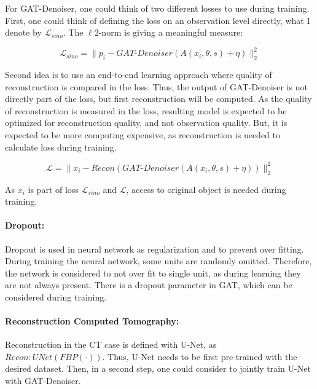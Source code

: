 For GAT-Denoiser, one could think of two different losses to use during training.
First, one could think of defining the loss on an observation level directly, 
what I denote by $\mathcal{L}_{sino}$. The $\ell2$-norm is giving a meaningful measure:

\begin{equation}
  \label{eq:loss_sino}
  \mathcal{L}_{sino} = \parallel p_i - \textit{GAT-Denoiser}(A(x_i, \theta, s) + \eta) \parallel ^2_2
\end{equation}

Second idea is to use an end-to-end learning approach where quality of reconstruction is 
compared in the loss. Thus, the output of GAT-Denoiser is not directly part of the loss, but first reconstruction will be computed.
As the quality of reconstruction is measured in the loss, resulting model is expected to be optimized
for reconstruction quality, and not observation quality. But, it is expected to be more computing expensive,
as reconstruction is needed to calculate loss during training.

\begin{equation}
  \label{eq:loss_reco}
  \mathcal{L} = \parallel x_i - \textit{Recon} ( \textit{GAT-Denoiser}(A(x_i, \theta, s) + \eta)) \parallel ^2_2
\end{equation}


As $x_i$ is part of loss $\mathcal{L}_{sino}$ and $\mathcal{L}$, access to original object is needed during training.

\paragraph{Dropout:}
Dropout is used in neural network as regularization and to prevent over fitting. 
During training the neural network, some units are randomly omitted. Therefore, the network is 
considered to not over fit to single unit, as during learning they are not always present.
There is a dropout parameter in GAT, which can be considered during training. 


\paragraph{Reconstruction Computed Tomography:}
Reconstruction in the CT case is defined with U-Net, as $\textit{Recon} : \textit{UNet} \left( \textit{FBP} \left( \cdot \right) \right)$.
Thus, U-Net needs to be first pre-trained with the desired dataset.
Then, in a second step, one could consider to jointly train U-Net with GAT-Denoiser.